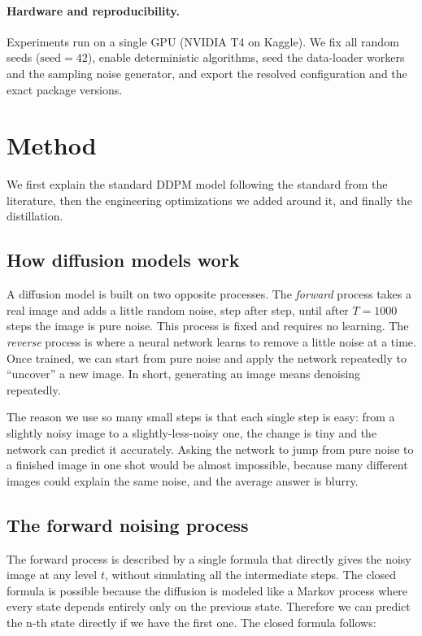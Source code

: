 \documentclass[11pt]{article}
\begin{document}
\paragraph{Hardware and reproducibility.} Experiments run on a single GPU (NVIDIA T4 on
Kaggle). We fix all random seeds ($\text{seed}=42$), enable deterministic algorithms,
seed the data-loader workers and the sampling noise generator, and export the resolved
configuration and the exact package versions.

\section{Method}
\label{sec:method}
We first explain the standard DDPM model following the standard from the literature,
then the engineering optimizations we added around it, and finally the distillation.

\subsection{How diffusion models work}
A diffusion model is built on two opposite processes. The \emph{forward} process takes a
real image and adds a little random noise, step after step, until after $T=1000$ steps
the image is pure noise. This process is fixed and requires no learning. The
\emph{reverse} process is where a neural network learns to remove a little
noise at a time. Once trained, we can start from pure noise and apply the network
repeatedly to ``uncover'' a new image. In short, generating an image means
denoising repeatedly.

The reason we use so many small steps is that each single step is easy: from a slightly
noisy image to a slightly-less-noisy one, the change is tiny and the network can predict
it accurately. Asking the network to jump from pure noise to a finished image in one shot
would be almost impossible, because many different images could explain the same
noise, and the average answer is blurry.

\subsection{The forward noising process}
The forward process is described by a single formula that directly gives the noisy image
at any level $t$, without simulating all the intermediate steps. The closed formula is possible because the diffusion is modeled like a Markov process where every state depends entirely only on the previous state. Therefore we can predict the n-th state directly if we have the first one. The closed formula follows:
\end{document}
